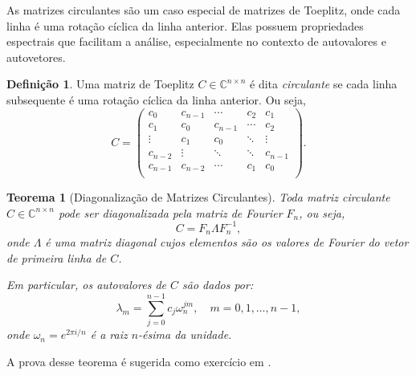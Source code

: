\documentclass[a4paper,12pt]{article}
\newtheorem*{theorem*}{Teorema}
\newtheorem{example}{Exemplo}
\theoremstyle{definition}
\newtheorem*{definition*}{Definição}
\begin{document}
As matrizes circulantes são um caso especial de matrizes de Toeplitz, onde cada linha é uma rotação cíclica da linha anterior. Elas possuem propriedades espectrais que facilitam a análise, especialmente no contexto de autovalores e autovetores.

\begin{definition*}
  Uma matriz de Toeplitz \( C \in \mathbb{C}^{n \times n} \) é dita \textit{circulante} se cada linha subsequente é uma rotação cíclica da linha anterior. Ou seja,
  \[
    C = \begin{pmatrix}
      c_0     & c_{n-1} & \cdots  & c_2    & c_1     \\
      c_1     & c_0     & c_{n-1} & \cdots & c_2     \\
      \vdots  & c_1     & c_0     & \ddots & \vdots  \\
      c_{n-2} & \vdots  & \ddots  & \ddots & c_{n-1} \\
      c_{n-1} & c_{n-2} & \cdots  & c_1    & c_0     \\
    \end{pmatrix}.
  \]
\end{definition*}

\begin{theorem*}[Diagonalização de Matrizes Circulantes]
  Toda matriz circulante $ C \in \mathbb{C}^{n \times n} $ pode ser diagonalizada pela matriz de Fourier $ F_n $, ou seja,
  \[
    C = F_n \Lambda F_n^{-1},
  \]
  onde $ \Lambda $ é uma matriz diagonal cujos elementos são os valores de Fourier do vetor de primeira linha de $ C $.

  Em particular, os autovalores de $ C $ são dados por:
  \[
    \lambda_m = \sum_{j=0}^{n-1} c_j \omega_n^{jm}, \quad m = 0, 1, \dots, n-1,
  \]
  onde $ \omega_n = e^{2\pi i / n} $ é a raiz $ n $-ésima da unidade.
\end{theorem*}

A prova desse teorema é sugerida como exercício em \cite[p. 100]{horn2013matrix}.

\end{document}
